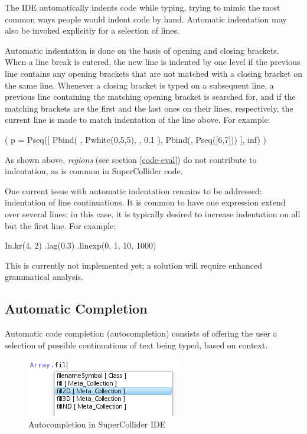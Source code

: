 \documentclass[11pt,a4paper]{article}
\begin{document}
The IDE automatically indents code while typing, trying to mimic the most common ways people would indent code by hand.
Automatic indentation may also be invoked explicitly for a selection of lines.

Automatic indentation is done on the basis of opening and closing brackets. When a line break is entered, the new line
is indented by one level if the previous line contains any opening brackets that are not matched with a closing bracket
on the same line. Whenever a closing bracket is typed on a subsequent line, a previous line containing the matching
opening bracket is searched for, and if the matching brackets are the first and the last ones on their lines,
respectively, the current line is made to match indentation of the line above. For example:

\begin{verbatimtab}[4]
(
p = Pseq([
	Pbind(
		\degree, Pwhite(0,5,5),
		\dur, 0.1
	),
	Pbind(\degree, Pseq([6,7]))
], inf)
)
\end{verbatimtab}

As shown above, \emph{regions} (see section \ref{code-eval}) do not contribute to indentation, as is common in
SuperCollider code.

One current issue with automatic indentation remains to be addressed: indentation of line continuations. It is common
to have one expression extend over several lines; in this case, it is typically desired to increase indentation on all
but the first line. For example:

\begin{verbatimtab}[4]
In.kr(4, 2)
	.lag(0.3)
	.linexp(0, 1, 10, 1000)
\end{verbatimtab}

This is currently not implemented yet; a solution will require enhanced grammatical analysis.

\subsection{Automatic Completion}
\label{auto-completion}

Automatic code completion (autocompletion) consists of offering the user a selection of possible
continuations of text being typed, based on context.

\begin{figure}[h]
  \includegraphics{autocompletion}
  \caption{Autocompletion in SuperCollider IDE}
  \label{fig:autocompletion}
\end{figure}
\end{document}
